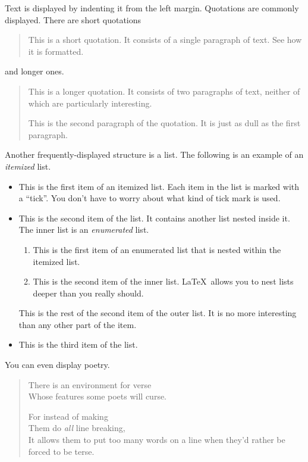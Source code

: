 \documentclass{UniVieCS_PhD}
\begin{document}
	Text is displayed by indenting it from the left
	margin.  Quotations are commonly displayed.  There
	are short quotations
	\begin{quote}
		This is a short quotation.  It consists of a 
		single paragraph of text.  See how it is formatted.
	\end{quote}
	and longer ones.
	\begin{quotation}
		This is a longer quotation.  It consists of two
		paragraphs of text, neither of which are
		particularly interesting.
		
		This is the second paragraph of the quotation.  It
		is just as dull as the first paragraph.
	\end{quotation}
	Another frequently-displayed structure is a list.
	The following is an example of an \emph{itemized}
	list.
	\begin{itemize}
		\item This is the first item of an itemized list.
		Each item in the list is marked with a ``tick''.
		You don't have to worry about what kind of tick
		mark is used.
		
		\item This is the second item of the list.  It
		contains another list nested inside it.  The inner
		list is an \emph{enumerated} list.
		\begin{enumerate}
			\item This is the first item of an enumerated 
			list that is nested within the itemized list.
			
			\item This is the second item of the inner list.  
			\LaTeX\ allows you to nest lists deeper than 
			you really should.
		\end{enumerate}
		This is the rest of the second item of the outer
		list.  It is no more interesting than any other
		part of the item.
		\item This is the third item of the list.
	\end{itemize}
	You can even display poetry.
	\begin{verse}
		There is an environment 
		for verse \\             %
		Whose features some poets %
		will curse.   
		
		
		For instead of making\\
		Them do \emph{all} line breaking, \\
		It allows them to put too many words on a line when they'd rather be 
		forced to be terse.
	\end{verse}
	
\end{document}
